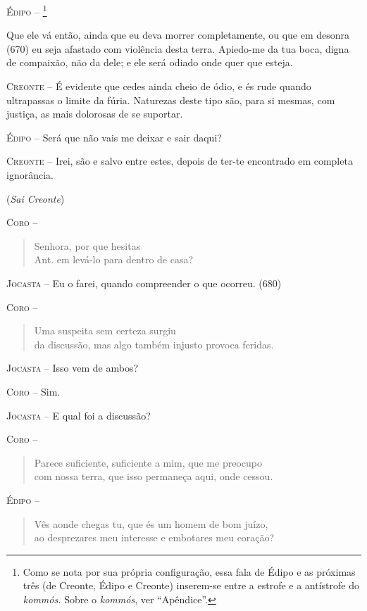 \textsc{Édipo} -- \footnote{Como se nota por sua própria configuração, essa
  fala de Édipo e as próximas três (de Creonte, Édipo e Creonte)
  inserem-se entre a estrofe e a antístrofe do \emph{kommós.} Sobre o
  \emph{kommós}, ver ``Apêndice''.}

Que ele vá então, ainda que eu deva morrer completamente, ou que em
desonra (670) eu seja afastado com violência desta terra. Apiedo-me da
tua boca, digna de compaixão, não da dele; e ele será odiado onde quer
que esteja.

\textsc{Creonte} --   É evidente que cedes ainda cheio de ódio, e és rude quando ultrapassas o
limite da fúria. Naturezas deste tipo são, para si mesmas, com justiça,
as mais dolorosas de se suportar.

\textsc{Édipo} --   Será que não vais me deixar e sair daqui?

\textsc{Creonte} --   Irei, são e salvo entre estes, depois de ter-te encontrado em completa
ignorância.

(\emph{Sai Creonte})

\textsc{Coro} -- \begin{verse}Senhora, por que hesitas\\ Ant.
em levá-lo para dentro de casa?
\end{verse}

\textsc{Jocasta} --   Eu o farei, quando compreender o que ocorreu. (680)

\textsc{Coro} -- \begin{verse}Uma suspeita sem certeza surgiu\\
da discussão, mas algo também injusto provoca feridas.
\end{verse}

\textsc{Jocasta} --   Isso vem de ambos?

\textsc{Coro} --   Sim.

\textsc{Jocasta} --   E qual foi a discussão?

\textsc{Coro} -- \begin{verse}Parece suficiente, suficiente a mim, que me preocupo\\
com nossa terra, que isso permaneça aqui, onde cessou.
\end{verse}

\textsc{Édipo} -- \begin{verse}Vês aonde chegas tu, que és um homem de bom juízo,\\
ao desprezares meu interesse e embotares meu coração?
\end{verse}


